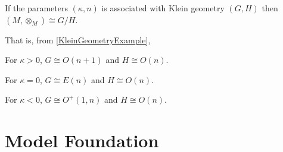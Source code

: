 \documentclass[stu, babel, american, biblatex, a4paper, leqno, draftall]{apa7}
\begin{document}
\begin{conjecture}\label{GeometricGroupStructure}
    If the parameters $\left(\kappa,n\right)$ is associated with Klein geometry $\left(G,H\right)$
    then $\left(M,\otimes_M\right)\cong G/H$.

    That is, from \cref{KleinGeometryExample},
    \begin{APAitemize}
        \item For $\kappa>0$, $G\cong O\left(n+1\right)$ and $H\cong O\left(n\right)$.
        \item For $\kappa=0$, $G\cong E\left(n\right)$ and $H\cong O\left(n\right)$.
        \item For $\kappa<0$, $G\cong O^{+}\left(1,n\right)$ and $H\cong O\left(n\right)$.
    \end{APAitemize}
\end{conjecture}

\section{Model Foundation}
\end{document}
